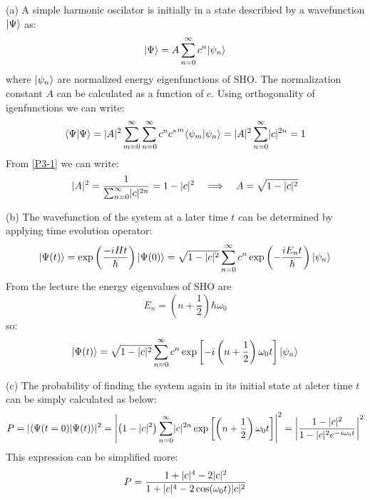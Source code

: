 \begin{homeworkProblem}

\begin{homeworkSection}{(a)}
A simple harmonic oscilator is initially in a state describied by a wavefunction $|\Psi\rangle$ as:
\begin{equation}
|\Psi\rangle=A\sum_{n=0}^{\infty}c^n|\psi_n\rangle
\end{equation}
where $|\psi_n\rangle$ are normalized energy eigenfunctions of SHO. The normalization constant $A$ can be calculated as a function of $c$. Using orthogonality of igenfunctions we can write:
\begin{equation} \label{P3-1}
\langle\Psi|\Psi\rangle=\lvert A\rvert^2\sum_{m=0}^{\infty}\sum_{n=0}^{\infty}c^{n}{c^*}^m\langle\psi_m|\psi_n\rangle=\lvert A\rvert^2\sum_{n=0}^{\infty}\lvert c\rvert^{2n}=1
\end{equation}
From \eqref{P3-1} we can write:
\begin{equation}
\lvert A\rvert^2=\frac{1}{\sum_{n=0}^{\infty}\lvert c\rvert^{2n}}=1-\lvert c\rvert^2\quad\Longrightarrow\quad A=\sqrt{1-\lvert c\rvert^2}
\end{equation}
\end{homeworkSection}
\begin{homeworkSection}{(b)}
The wavefunction of the system at a later time $t$ can be determined by applying time evolution operator:
\begin{equation}
|\Psi(t)\rangle=\exp\left(\frac{-iHt}{\hbar}\right)|\Psi(0)\rangle=\sqrt{1-\lvert c\rvert^2}\sum_{n=0}^{\infty}c^n\exp\left(-\frac{iE_nt}{\hbar}\right)|\psi_n\rangle
\end{equation}
From the lecture the  energy eigenvalues of SHO are 
$$E_n=\left(n+\frac{1}{2}\right)\hbar\omega_0$$ 
so:
\begin{equation}
|\Psi(t)\rangle=
\sqrt{1-\lvert c\rvert^2}\sum_{n=0}^{\infty}c^n\exp\left[-i\left(n+\frac{1}{2}\right)\omega_0t\right]|\psi_n\rangle
\end{equation}


\end{homeworkSection}
\begin{homeworkSection}{(c)}
The probability of finding the system again in its initial state at aleter time $t$ can be simply calculated as below:
\begin{equation}
P=\lvert\langle\Psi(t=0)|\Psi(t)\rangle\rvert^2=\left|\left(1-\lvert c\rvert^2\right)\sum_{n=0}^{\infty}\lvert c\rvert^{2n}\exp\left[\left(n+\frac{1}{2}\right)\omega_0 t\right]\right|^2
=\left|\frac{1-\lvert c\rvert^2}{1-\lvert c\rvert^2e^{-i\omega_0 t}}\right|^2
\end{equation}
This expression can be simplified more:
\begin{equation}
P=\frac{1+\lvert c\rvert^4-2\lvert c\rvert^2}{1+\lvert c\rvert^4-2\cos(\omega_0 t)\lvert c\rvert^2}
\end{equation}





\end{homeworkSection}
\end{homeworkProblem}
